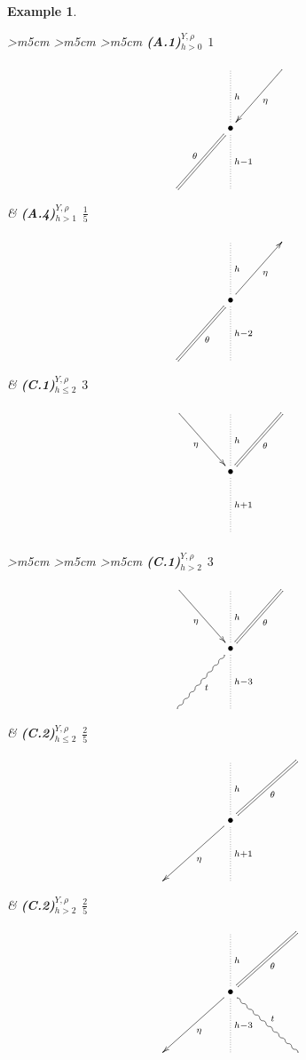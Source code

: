 \documentclass[english,letter paper,12pt,leqno]{article}
\theoremstyle{example}
\newtheorem{example}[theorem]{Example}
\numberwithin{equation}{section}
\begin{document}
\begin{example}
\begin{center}
\begin{tabular}{ >{\centering}m{5cm} >{\centering}m{5cm} >{\centering}m{5cm} }
\textbf{(A.1)${}^{Y,\rho}_{h > 0}$ $1$}
\vspace{0.1cm}
\[
\xymatrix@C+1pc@R+1.5pc{
& \ar@{.}[d]^-{h} & \ar[dl]^-{\eta}\\
& \bullet \ar@{=}[dl]_-{\theta} \ar@{.}[d]^-{h-1} \\
& &
}
\]
&
\textbf{(A.4)${}^{Y,\rho}_{h>1}$ $\frac{1}{5}$}
\vspace{0.1cm}
\[
\xymatrix@C+1pc@R+1.5pc{
& \ar@{.}[d]^-{h} &\\
& \bullet \ar[ur]_-{\eta} \ar@{=}[dl]^-{\theta} \ar@{.}[d]^-{h-2} \\
& &
}
\]
&
\textbf{(C.1)${}^{Y,\rho}_{h \le 2}$ $3$}
\vspace{0.1cm}
\[
\xymatrix@C+1pc@R+1.5pc{
\ar[dr]_-{\eta} & \ar@{.}[d]^-{h} & \ar@{=}[dl]^-{\theta}\\
& \bullet \ar@{.}[d]^-{h+1} \\
& &
}
\]
\end{tabular}
\end{center}

\begin{center}
\begin{tabular}{ >{\centering}m{5cm} >{\centering}m{5cm} >{\centering}m{5cm} }
\textbf{(C.1)${}^{Y,\rho}_{h>2}$ $3$}
\vspace{0.1cm}
\[
\xymatrix@C+1pc@R+1.5pc{
\ar[dr]_-{\eta} & \ar@{.}[d]^-{h} & \ar@{=}[dl]^-{\theta}\\
& \bullet \ar@{.}[d]^-{h-3} \ar@{~}[dl]^-{t}\\
& &
}
\]
&
\textbf{(C.2)${}^{Y,\rho}_{h \le 2}$ $\frac{2}{5}$}
\vspace{0.1cm}
\[
\xymatrix@C+2pc@R+1.5pc{
& \ar@{.}[d]^-{h} & \ar@{=}[dl]^-{\theta} \\
& \bullet \ar[dl]^-{\eta}\ar@{.}[d]^-{h+1}\\
& &
}
\]
&
\textbf{(C.2)${}^{Y,\rho}_{h > 2}$ $\frac{2}{5}$}
\vspace{0.1cm}
\[
\xymatrix@C+2pc@R+1.5pc{
& \ar@{.}[d]^-{h} & \ar@{=}[dl]^-{\theta} \\
& \bullet \ar[dl]^-{\eta}\ar@{.}[d]^-{h-3} \ar@{~}[dr]^-{t}\\
& &
}
\]
\end{tabular}
\end{center}


\end{example}
\end{document}
